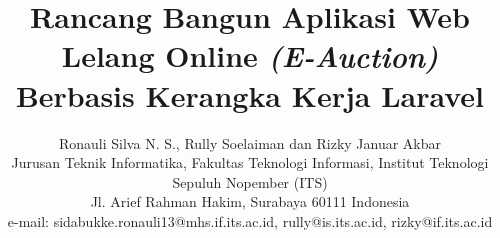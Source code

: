 
\author{Ronauli Silva N. S., Rully Soelaiman dan Rizky Januar Akbar\\
	Jurusan Teknik Informatika, Fakultas Teknologi Informasi, Institut Teknologi Sepuluh Nopember (ITS)\\
	Jl. Arief Rahman Hakim, Surabaya 60111 Indonesia\\
	e-mail: sidabukke.ronauli13@mhs.if.its.ac.id, rully@is.its.ac.id, rizky@if.its.ac.id
	}%




\title{Rancang Bangun Aplikasi Web Lelang Online \textit{(E-Auction)} Berbasis Kerangka Kerja Laravel}
\maketitle